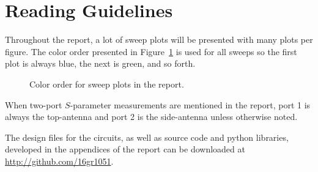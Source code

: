 \section*{Reading Guidelines}
Throughout the report, a lot of sweep plots will be presented with many plots per figure. The color order presented in Figure~\ref{fig:colororder} is used for all sweeps so the first plot is always blue, the next is green, and so forth.

\begin{figure}[htbp]
    \centering
    \caption{Color order for sweep plots in the report.}
    \label{fig:colororder}
\end{figure}

When two-port $S$-parameter measurements are mentioned in the report, port 1 is always the top-antenna and port 2 is the side-antenna unless otherwise noted.

The design files for the circuits, as well as source code and python libraries, developed in the appendices of the report can be downloaded at \url{http://github.com/16gr1051}.
